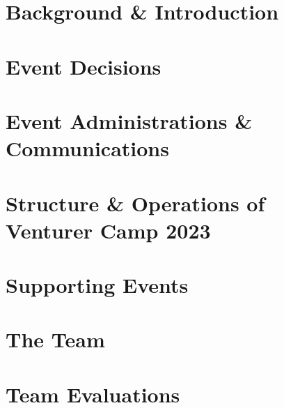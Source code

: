 \documentclass[a4paper, 11pt]{report}
\begin{document}
\makeDocumentTitle

\tableofcontents


\part{Background \& Introduction} %
    
    
    
\part{Event Decisions} %
    
    
    
    
    
    
\part{Event Administrations \& Communications} %
    
    
    
    
\part{Structure \& Operations of Venturer Camp 2023} %
    
    
    
    
    
\part{Supporting Events} %
    
    
    
    
    
\part{The Team} %
    
    
    
    
    
\part{Team Evaluations} %
    
    
    
    
    
    
    
    
    
    
\end{document}
